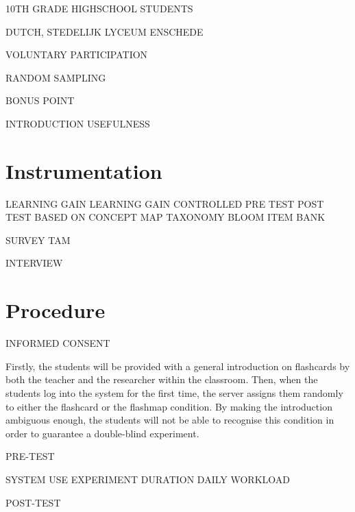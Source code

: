 
10TH GRADE HIGHSCHOOL STUDENTS

DUTCH, STEDELIJK LYCEUM ENSCHEDE

VOLUNTARY PARTICIPATION

RANDOM SAMPLING

BONUS POINT

INTRODUCTION USEFULNESS

\section{Instrumentation}



LEARNING GAIN
    LEARNING GAIN CONTROLLED
    PRE TEST
    POST TEST
    BASED ON CONCEPT MAP
    TAXONOMY BLOOM
    ITEM BANK

SURVEY
    TAM

INTERVIEW

\section{Procedure}



INFORMED CONSENT

Firstly, the students will be provided with a general introduction on flashcards by both the teacher and the researcher within the classroom. Then, when the students log into the system for the first time, the server assigns them randomly to either the flashcard or the flashmap condition. By making the introduction ambiguous enough, the students will not be able to recognise this condition in order to guarantee a double-blind experiment.

PRE-TEST

SYSTEM USE
    EXPERIMENT DURATION
    DAILY WORKLOAD

POST-TEST

